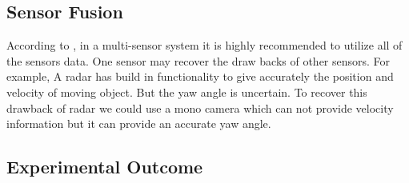 \subsection{Sensor Fusion}
According to \cite{Kunz_2015}, in a multi-sensor system it is highly recommended to utilize all of the sensors data. One sensor may recover the draw backs of other sensors. For example, A radar has build in functionality to give accurately the position and velocity of moving object. But the yaw angle is uncertain. To recover this drawback of radar we could use a mono camera which can not provide velocity information but it can provide an accurate yaw angle.


\subsection{Experimental Outcome}


